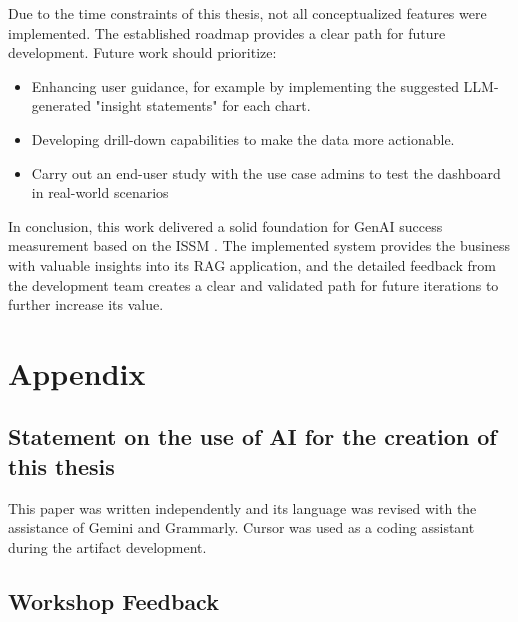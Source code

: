 \documentclass[
	english,
	ruledheaders=section,%
	class=report,%
	thesis={type=bachelor},%
	accentcolor=1b,%
	custommargins=true,%
	marginpar=false,%
	parskip=half-,%
	fontsize=11pt,%
	DIV=14,
]{tudapub}
\begin{document}
Due to the time constraints of this thesis, not all conceptualized features were implemented. The established roadmap provides a clear path for future development. Future work should prioritize:
\begin{itemize}
    \item Enhancing user guidance, for example by implementing the suggested LLM-generated "insight statements" for each chart.
    \item Developing drill-down capabilities to make the data more actionable.
    \item Carry out an end-user study with the use case admins to test the dashboard in real-world scenarios
\end{itemize}

In conclusion, this work delivered a solid foundation for GenAI success measurement based on the ISSM \parencite{DeloneMcLean2003ISSuccessTenYearUpdate}. The implemented system provides the business with valuable insights into its RAG application, and the detailed feedback from the development team creates a clear and validated path for future iterations to further increase its value.
\appendix

\chapter*{Appendix}

\setcounter{page}{\value{seitenzahlroemisch}}

\section*{Statement on the use of AI for the creation of this thesis}
This paper was written independently and its language was revised with the assistance of Gemini and Grammarly. Cursor was used as a coding assistant during the artifact development.

\section*{Workshop Feedback}
\end{document}
